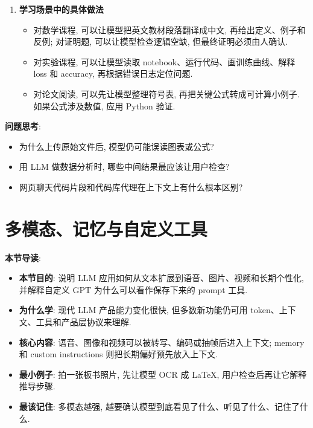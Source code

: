\documentclass{../nndlcourse}
\begin{document}
\begin{enumerate}
\begin{itemize}
      \item 这类工具把代码库上下文提供给模型: 当前文件、目录结构、依赖、测试命令和错误日志都能进入上下文. 因此模型能修改多个文件、安装依赖、运行测试并根据反馈修复.
      \item 这种方式常被称为 vibe coding, 但它并不意味着不用懂工程. 模型可能做没看懂的修改、引入未知资源或破坏边界. 用户要审查 diff、确认命令、运行测试, 必要时回到传统编程.
    \end{itemize}
  \item \textbf{学习场景中的具体做法}
    \begin{itemize}
      \item 对数学课程, 可以让模型把英文教材段落翻译成中文, 再给出定义、例子和反例; 对证明题, 可以让模型检查逻辑空缺, 但最终证明必须由人确认.
      \item 对实验课程, 可以让模型读取 notebook、运行代码、画训练曲线、解释 loss 和 accuracy, 再根据错误日志定位问题.
      \item 对论文阅读, 可以先让模型整理符号表, 再把关键公式转成可计算小例子. 如果公式涉及数值, 应用 Python 验证.
    \end{itemize}
\end{enumerate}

\textbf{问题思考}:
\begin{itemize}
  \item 为什么上传原始文件后, 模型仍可能误读图表或公式?
  \item 用 LLM 做数据分析时, 哪些中间结果最应该让用户检查?
  \item 网页聊天代码片段和代码库代理在上下文上有什么根本区别?
\end{itemize}

\section{多模态、记忆与自定义工具}

\textbf{本节导读}:
\begin{itemize}
  \item \textbf{本节目的}: 说明 LLM 应用如何从文本扩展到语音、图片、视频和长期个性化, 并解释自定义 GPT 为什么可以看作保存下来的 prompt 工具.
  \item \textbf{为什么学}: 现代 LLM 产品能力变化很快, 但多数新功能仍可用 token、上下文、工具和产品层协议来理解.
  \item \textbf{核心内容}: 语音、图像和视频可以被转写、编码或抽帧后进入上下文; memory 和 custom instructions 则把长期偏好预先放入上下文.
  \item \textbf{最小例子}: 拍一张板书照片, 先让模型 OCR 成 LaTeX, 用户检查后再让它解释推导步骤.
  \item \textbf{最该记住}: 多模态越强, 越要确认模型到底看见了什么、听见了什么、记住了什么.
\end{itemize}
\end{document}
